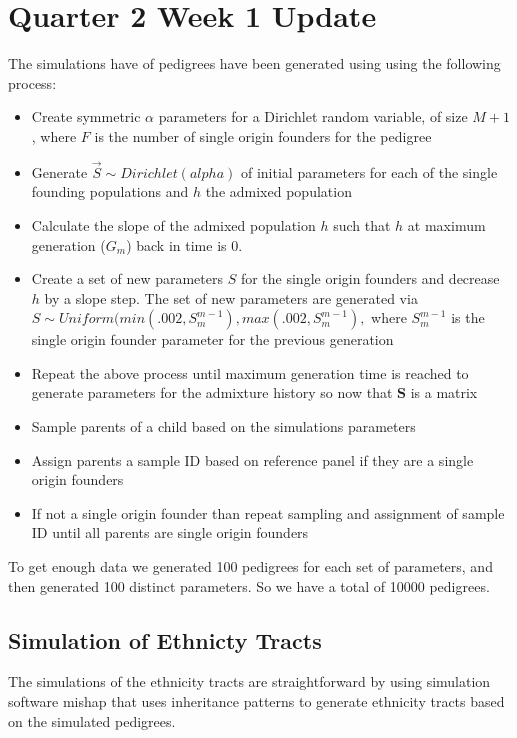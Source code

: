 \documentclass[./main.tex]{subfiles}
\title{}
\begin{document}
\section{Quarter 2 Week 1 Update}

The simulations have of pedigrees have been generated using using the following process:

\begin{itemize}
  \item Create symmetric $\alpha$ parameters for a Dirichlet random variable, of size $M+1$, where $F$ is the number of single origin founders for the  pedigree
  \item Generate $\Vec{S} \sim Dirichlet(alpha)$ of initial parameters for each of the single founding populations and $h$ the admixed population
  \item Calculate the slope of the admixed population $h$ such that $h$ at maximum generation ($G_m$) back in time is 0. 
  \item Create a set of new parameters $S$ for the single origin founders and decrease $h$ by a slope step.  The set of new parameters are generated via $S \sim Uniform(min(.002,S_{m}^{m-1}),max(.002,S_{m}^{m-1}),$ where $S_{m}^{m-1}$ is the single origin founder parameter for the previous generation
  \item Repeat the above process until maximum generation time is reached to generate parameters for the admixture history so now that $\mathbf{S}$ is a matrix 
  \item Sample parents of a child based on the simulations parameters 
  \item Assign parents a sample ID based on reference panel if they are a single origin founders
  \item If not a single origin founder than repeat sampling and assignment of sample ID until all parents are single origin founders
\end{itemize}

To get enough data we generated 100 pedigrees for each set of parameters, and then generated 100 distinct parameters. So we have a total of 10000 pedigrees.  

\subsection{Simulation of Ethnicty Tracts}

The simulations of the ethnicity tracts are straightforward by using simulation software mishap that uses inheritance patterns to generate ethnicity tracts based on the simulated pedigrees.
\end{document}
